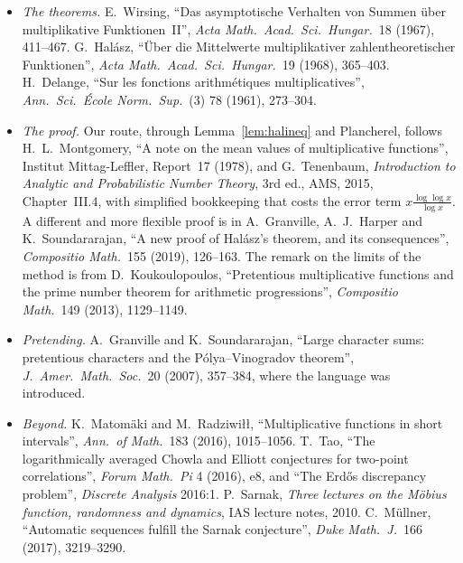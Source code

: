 \begin{itemize}
\item \emph{The theorems.} E.~Wirsing, ``Das asymptotische Verhalten von Summen über multiplikative Funktionen~II'', \emph{Acta Math.\ Acad.\ Sci.\ Hungar.}\ 18 (1967), 411--467. G.~Halász, ``Über die Mittelwerte multiplikativer zahlentheoretischer Funktionen'', \emph{Acta Math.\ Acad.\ Sci.\ Hungar.}\ 19 (1968), 365--403. H.~Delange, ``Sur les fonctions arithmétiques multiplicatives'', \emph{Ann.\ Sci.\ École Norm.\ Sup.}\ (3) 78 (1961), 273--304.
\item \emph{The proof.} Our route, through Lemma~\ref{lem:halineq} and Plancherel, follows H.~L.~Montgomery, ``A note on the mean values of multiplicative functions'', Institut Mittag-Leffler, Report~17 (1978), and G.~Tenenbaum, \emph{Introduction to Analytic and Probabilistic Number Theory}, 3rd ed., AMS, 2015, Chapter~III.4, with simplified bookkeeping that costs the error term $x\frac{\log\log x}{\log x}$. A different and more flexible proof is in A.~Granville, A.~J.~Harper and K.~Soundararajan, ``A new proof of Halász's theorem, and its consequences'', \emph{Compositio Math.}\ 155 (2019), 126--163. The remark on the limits of the method is from D.~Koukoulopoulos, ``Pretentious multiplicative functions and the prime number theorem for arithmetic progressions'', \emph{Compositio Math.}\ 149 (2013), 1129--1149.
\item \emph{Pretending.} A.~Granville and K.~Soundararajan, ``Large character sums: pretentious characters and the Pólya--Vinogradov theorem'', \emph{J.\ Amer.\ Math.\ Soc.}\ 20 (2007), 357--384, where the language was introduced.
\item \emph{Beyond.} K.~Matomäki and M.~Radziwiłł, ``Multiplicative functions in short intervals'', \emph{Ann.\ of Math.}\ 183 (2016), 1015--1056. T.~Tao, ``The logarithmically averaged Chowla and Elliott conjectures for two-point correlations'', \emph{Forum Math.\ Pi} 4 (2016), e8, and ``The Erdős discrepancy problem'', \emph{Discrete Analysis} 2016:1. P.~Sarnak, \emph{Three lectures on the Möbius function, randomness and dynamics}, IAS lecture notes, 2010. C.~Müllner, ``Automatic sequences fulfill the Sarnak conjecture'', \emph{Duke Math.\ J.}\ 166 (2017), 3219--3290.
\end{itemize}
